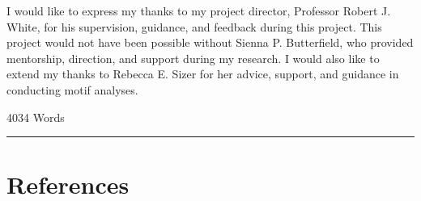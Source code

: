 \documentclass[
  12pt,
]{article}
\begin{document}
I would like to express my thanks to my project director, Professor Robert J. White, for his supervision, guidance, and feedback during this project.
This project would not have been possible without Sienna P. Butterfield, who provided mentorship, direction, and support during my research.
I would also like to extend my thanks to Rebecca E. Sizer for her advice, support, and guidance in conducting motif analyses.

\begin{flushright}
4034 Words
\end{flushright}
\footnotesize

\begin{center}\rule{0.5\linewidth}{0.5pt}\end{center}

\hypertarget{references}{%
\section*{References}\label{references}}
\end{document}
